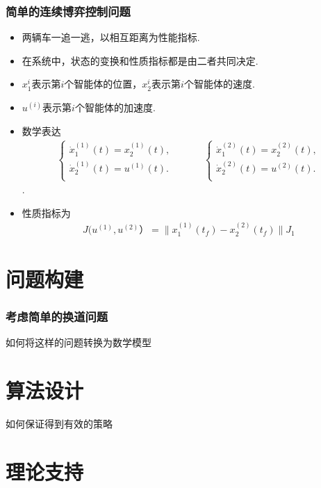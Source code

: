 \documentclass[UTF8, aspectratio=169, 10pt]{ctexbeamer}
\begin{document}
\begin{frame}
  \frametitle{简单的连续博弈控制问题}
  \begin{itemize}
  \item 两辆车一追一逃，以相互距离为性能指标.
  \item 在系统中，状态的变换和性质指标都是由二者共同决定.
  \item $x_1^i$表示第$i$个智能体的位置，$x_2^i$表示第$i$个智能体的速度.
  \item $u^{(i)}$表示第$i$个智能体的加速度.
  \item 数学表达
    \begin{align}
      \left\{\begin{matrix}
          \dot{x}_1^{(1)} (t) = x_2^{(1)} (t), \\
          \dot{x}_2^{(1)} (t) = u^{(1)} (t). \\
        \end{matrix}\right.
      \quad \quad \quad
      \left\{\begin{matrix}
          \dot{x}_1^{(2)} (t) = x_2^{(2)} (t), \\
          \dot{x}_2^{(2)} (t) = u^{(2)} (t). \\
        \end{matrix}\right.
    \end{align}.
  \item 性质指标为
    \begin{align}
      J(u^{(1)}, u^{(2)}） = \| x_1^{(1)} (t_f) - x_2^{(2)} (t_f) \|
      J_1
    \end{align}
  \end{itemize}
\end{frame}

\section{问题构建}
\begin{frame}
\frametitle{考虑简单的换道问题}
  如何将这样的问题转换为数学模型
\end{frame}

\section{算法设计}
\begin{frame}

  如何保证得到有效的策略
\end{frame}




\section{理论支持}
\begin{frame}

\end{frame}
\end{document}
